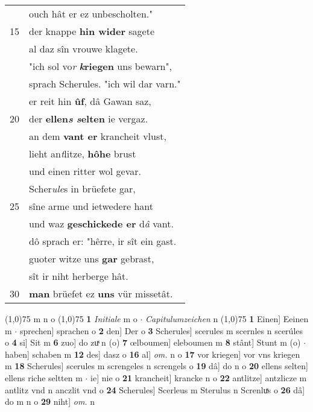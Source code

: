 \documentclass[8pt,a4paper,notitlepage]{article}
\begin{document}
\begin{table}[ht]
\begin{minipage}[t]{0.5\linewidth}
\begin{tabular}{rl}
 & ouch hât er ez unbescholten."\\ 
15 & der knappe \textbf{hin wider} sagete\\ 
 & al daz sîn vrouwe klagete.\\ 
 & "ich sol vo\textit{r} \textbf{\textit{k}riegen} uns bewarn",\\ 
 & sprach Scherules. "ich wil dar varn."\\ 
 & er reit hin \textbf{ûf}, dâ Gawan saz,\\ 
20 & der \textbf{ellen\textit{s} \textit{s}elten} ie vergaz.\\ 
 & an dem \textbf{vant er} krancheit vlust,\\ 
 & lieht an\textit{t}litze, \textbf{hôhe} brust\\ 
 & und einen ritter wol gevar.\\ 
 & Scher\textit{ule}s in brüefete gar,\\ 
25 & sîne arme und ietwedere hant\\ 
 & und waz \textbf{geschickede er} d\textit{â} vant.\\ 
 & dô sprach er: "hêrre, ir sît ein gast.\\ 
 & guoter witze uns \textbf{gar} gebrast,\\ 
 & sît ir niht herberge hât.\\ 
30 & \textbf{man} brüefet ez \textbf{uns} vür missetât.\\ 
\end{tabular}
\scriptsize
\line(1,0){75} \newline
m n o \newline
\line(1,0){75} \newline
\textbf{1} \textit{Initiale} m o   $\cdot$ \textit{Capitulumzeichen} n  \newline
\line(1,0){75} \newline
\textbf{1} Einen] Eeinen m  $\cdot$ sprechen] sprachen o \textbf{2} den] Der o \textbf{3} Scherules] scerules m scernles n scerúles o \textbf{4} si] Sit m \textbf{6} zuo] do zuͯ n (o) \textbf{7} œlboumen] eleboumen m \textbf{8} stânt] Stunt m (o)  $\cdot$ haben] schaben m \textbf{12} des] dasz o \textbf{16} al] \textit{om.} n o \textbf{17} vor kriegen] vor vns kriegen m \textbf{18} Scherules] scerules m screngeles n screngels o \textbf{19} dâ] do n o \textbf{20} ellens selten] ellens riche seltten m  $\cdot$ ie] nie o \textbf{21} krancheit] krancke n o \textbf{22} antlitze] antzlicze m antlitz vnd n anczlit vnd o \textbf{24} Scherules] Scerleus m Sterulus n Screnluͯs o \textbf{26} dâ] do m n o \textbf{29} niht] \textit{om.} n \newline
\end{minipage}
\end{table}
\end{document}
